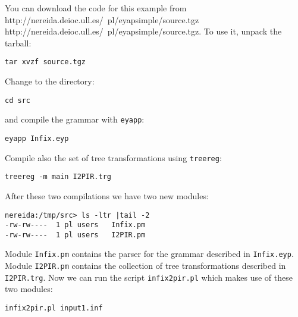 You can download the code for this example from
\htmladdnormallink
{http://nereida.deioc.ull.es/~pl/eyapsimple/source.tgz}
{http://nereida.deioc.ull.es/~pl/eyapsimple/source.tgz}.
To use it, unpack the tarball:
\begin{verbatim}
tar xvzf source.tgz
\end{verbatim}
Change to the directory:
\begin{verbatim}
cd src
\end{verbatim}
and compile the grammar with \verb|eyapp|:
\begin{verbatim}
eyapp Infix.eyp
\end{verbatim}
Compile also the set of tree transformations using \verb|treereg|:
\begin{verbatim}
treereg -m main I2PIR.trg
\end{verbatim}
After these two compilations we have two new modules:
\begin{verbatim}
nereida:/tmp/src> ls -ltr |tail -2
-rw-rw----  1 pl users   Infix.pm
-rw-rw----  1 pl users   I2PIR.pm
\end{verbatim}
Module \verb|Infix.pm| contains the parser for the grammar described in \verb|Infix.eyp|.
Module \verb|I2PIR.pm| contains the collection of tree transformations described
in \verb|I2PIR.trg|. Now we can run the script \verb|infix2pir.pl| which makes use of these
two modules:
\begin{verbatim}
infix2pir.pl input1.inf
\end{verbatim}
